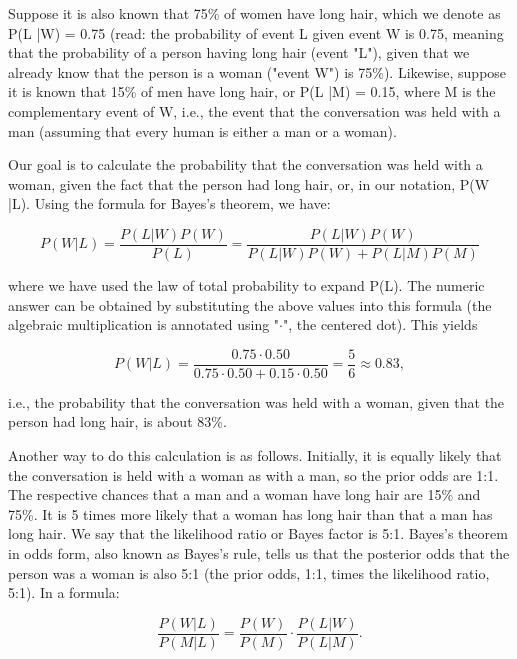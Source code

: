 Suppose it is also known that 75\% of women have long hair, which we denote as P(L |W) = 0.75 (read: the probability of event L given event W is 0.75, meaning that the probability of a person having long hair (event "L"), given that we already know that the person is a woman ("event W") is 75\%). Likewise, suppose it is known that 15\% of men have long hair, or P(L |M) = 0.15, where M is the complementary event of W, i.e., the event that the conversation was held with a man (assuming that every human is either a man or a woman).

Our goal is to calculate the probability that the conversation was held with a woman, given the fact that the person had long hair, or, in our notation, P(W |L). Using the formula for Bayes's theorem, we have:

\begin{equation*}
  P(W|L) = \frac{P(L|W) P(W)}{P(L)} = \frac{P(L|W) P(W)}{P(L|W) P(W) + P(L|M) P(M)}
\end{equation*}

where we have used the law of total probability to expand P(L). The numeric answer can be obtained by substituting the above values into this formula (the algebraic multiplication is annotated using "$\cdot$", the centered dot). This yields

\begin{equation*}
  P(W|L) = \frac{0.75\cdot0.50}{0.75\cdot0.50 + 0.15\cdot0.50} = \frac56\approx 0.83,
\end{equation*}

i.e., the probability that the conversation was held with a woman, given that the person had long hair, is about 83\%.

Another way to do this calculation is as follows. Initially, it is equally likely that the conversation is held with a woman as with a man, so the prior odds are 1:1. The respective chances that a man and a woman have long hair are 15\% and 75\%. It is 5 times more likely that a woman has long hair than that a man has long hair. We say that the likelihood ratio or Bayes factor is 5:1. Bayes's theorem in odds form, also known as Bayes's rule, tells us that the posterior odds that the person was a woman is also 5:1 (the prior odds, 1:1, times the likelihood ratio, 5:1). In a formula:

\begin{equation*}
  \frac{P(W|L)}{P(M|L)} = \frac{P(W)}{P(M)} \cdot \frac{P(L|W)}{P(L|M)}.
\end{equation*}

